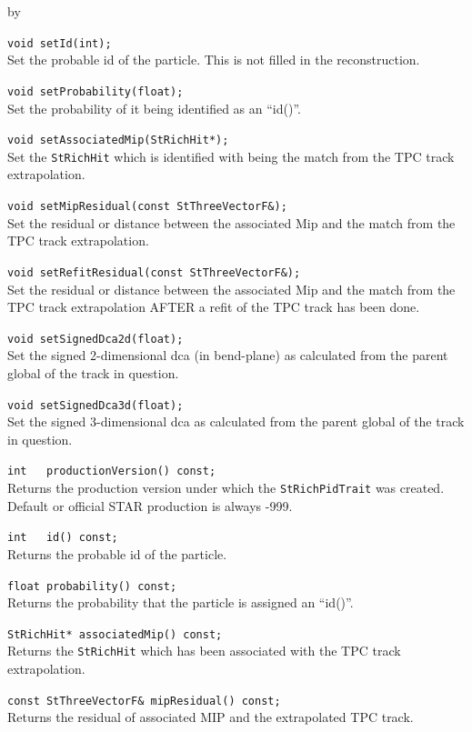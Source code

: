 \documentclass[twoside]{article}
\newcommand{\entrylabel}[1]{\mbox{\textbf{{#1}}}\hfil}%
\newenvironment{entry}
{\begin{list}{}%
    {\renewcommand{\makelabel}{\entrylabel}%
     \setlength{\labelwidth}{90pt}%
     \setlength{\leftmargin}{\labelwidth}
     \advance\leftmargin by \labelsep%
      }%
    }%
  {\end{list}}
\newcommand{\Entrylabel}[1]%
{\raisebox{0pt}[1ex][0pt]{\makebox[\labelwidth][l]%
    {\parbox[t]{\labelwidth}{\hspace{0pt}\textbf{{#1}}}}}}
\newenvironment{Entry}%
{\renewcommand{\entrylabel}{\Entrylabel}\begin{entry}}%
  {\end{entry}}
\begin{document}
\begin{Entry}
    \verb+void setId(int);+\\
    Set the probable id of the particle.  This is not filled
    in the reconstruction.
    
    \verb+void setProbability(float);+\\
    Set the probability of it being identified as
    an ``id()''.
    
    \verb+void setAssociatedMip(StRichHit*);+\\
    Set the \texttt{StRichHit} which is identified
    with being the match from the TPC track extrapolation.
    
    \verb+void setMipResidual(const StThreeVectorF&);+\\
    Set the residual or distance between the associated Mip and
    the match from the TPC track extrapolation.

    \verb+void setRefitResidual(const StThreeVectorF&);+\\
    Set the residual or distance between the associated Mip and
    the match from the TPC track extrapolation AFTER a
    refit of the TPC track has been done.
    
    \verb+void setSignedDca2d(float);+\\
    Set the signed 2-dimensional dca (in bend-plane)
    as calculated from the parent global
    of the track in question.
    
    \verb+void setSignedDca3d(float);+\\
    Set the signed 3-dimensional dca
    as calculated from the parent global
    of the track in question.

    \verb+int   productionVersion() const;+\\
    Returns the production version under which
    the \texttt{StRichPidTrait} was created.
    Default or official STAR production is always
    -999.
    
    \verb+int   id() const;+\\
    Returns the probable id of the particle.
    
    \verb+float probability() const;+\\
    Returns the probability that the particle is
    assigned an ``id()''.

    \verb+StRichHit* associatedMip() const;+\\
    Returns the \texttt{StRichHit} which has been
    associated with the TPC track extrapolation.
    
    \verb+const StThreeVectorF& mipResidual() const;+\\
    Returns the residual of associated MIP and the
    extrapolated TPC track.
    

\end{Entry}
\end{document}
